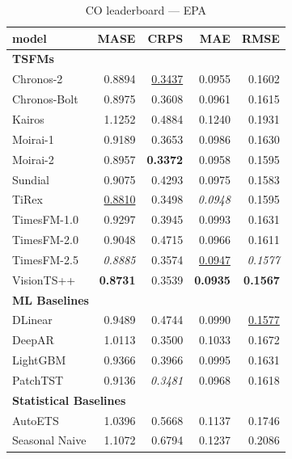\begin{table}[H]
\caption{CO leaderboard --- EPA}
\centering
\begin{small}
\begin{tabular}{lrrrr}
\toprule
model & MASE & CRPS & MAE & RMSE \\
\midrule
\multicolumn{5}{l}{\textbf{TSFMs}} \\
Chronos-2 & 0.8894 & \underline{0.3437} & 0.0955 & 0.1602 \\
Chronos-Bolt & 0.8975 & 0.3608 & 0.0961 & 0.1615 \\
Kairos & 1.1252 & 0.4884 & 0.1240 & 0.1931 \\
Moirai-1 & 0.9189 & 0.3653 & 0.0986 & 0.1630 \\
Moirai-2 & 0.8957 & \textbf{0.3372} & 0.0958 & 0.1595 \\
Sundial & 0.9075 & 0.4293 & 0.0975 & 0.1583 \\
TiRex & \underline{0.8810} & 0.3498 & \textit{0.0948} & 0.1595 \\
TimesFM-1.0 & 0.9297 & 0.3945 & 0.0993 & 0.1631 \\
TimesFM-2.0 & 0.9048 & 0.4715 & 0.0966 & 0.1611 \\
TimesFM-2.5 & \textit{0.8885} & 0.3574 & \underline{0.0947} & \textit{0.1577} \\
VisionTS++ & \textbf{0.8731} & 0.3539 & \textbf{0.0935} & \textbf{0.1567} \\
\midrule
\multicolumn{5}{l}{\textbf{ML Baselines}} \\
DLinear & 0.9489 & 0.4744 & 0.0990 & \underline{0.1577} \\
DeepAR & 1.0113 & 0.3500 & 0.1033 & 0.1672 \\
LightGBM & 0.9366 & 0.3966 & 0.0995 & 0.1631 \\
PatchTST & 0.9136 & \textit{0.3481} & 0.0968 & 0.1618 \\
\midrule
\multicolumn{5}{l}{\textbf{Statistical Baselines}} \\
AutoETS & 1.0396 & 0.5668 & 0.1137 & 0.1746 \\
Seasonal Naive & 1.1072 & 0.6794 & 0.1237 & 0.2086 \\
\bottomrule
\end{tabular}
\end{small}
\end{table}